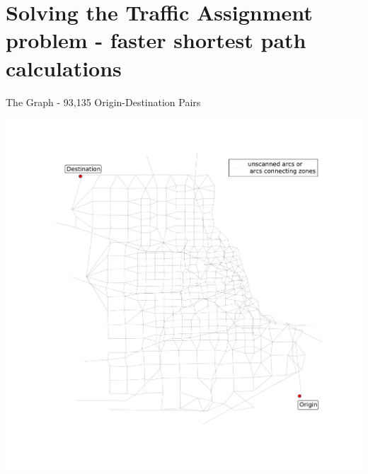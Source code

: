 \documentclass{beamer}
\begin{document}

\section{Solving the Traffic Assignment problem - faster shortest path calculations}
\begin{frame}[shrink]{The Graph - 93,135 Origin-Destination Pairs}
    \begin{center}
        \includegraphics[page=1,width=\paperwidth, height=\paperheight, keepaspectratio,trim=0 120px 48px 120px,clip]{img/chicago_dijkstra_animation}
    \end{center}
\end{frame}
\end{document}

